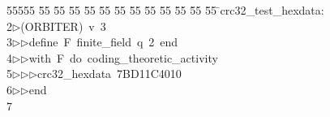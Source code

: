 %
%
\begin{tabbing}
55555 \= 55 \= 55 \= 55 \= 55 \= 55 \= 55 \= 55 \= 55 \= 55 \= 55 \= 55 \= 55 \= \>crc32\_test\_hexdata:\\[0pt]
2\>$\triangleright$\>(ORBITER)\ v\ 3\ \\[0pt]
3\>$\triangleright$\>$\triangleright$\>define\ F\ finite\_field\ q\ 2\ end\ \\[0pt]
4\>$\triangleright$\>$\triangleright$\>with\ F\ do\ coding\_theoretic\_activity\ \\[0pt]
5\>$\triangleright$\>$\triangleright$\>$\triangleright$\>crc32\_hexdata\ 7BD11C4010\ \\[0pt]
6\>$\triangleright$\>$\triangleright$\>end\\[0pt]
7\>\end{tabbing}
